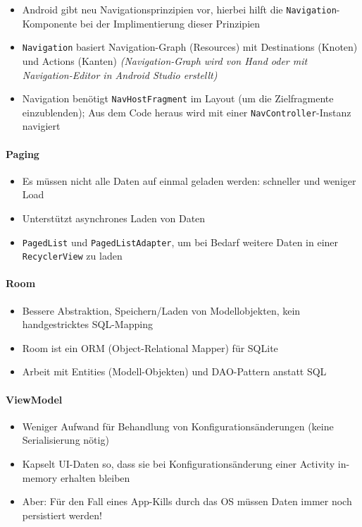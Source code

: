 \documentclass[a4paper]{article}
\begin{document}
				\begin{itemize}
					\item Android gibt neu Navigationsprinzipien vor, hierbei hilft die \texttt{Navigation}-Komponente bei der Implimentierung dieser Prinzipien
					\item \texttt{Navigation} basiert Navigation-Graph (Resources) mit Destinations (Knoten) und Actions (Kanten)
						\textit{(Navigation-Graph wird von Hand oder mit Navigation-Editor in Android Studio erstellt)}
					\item Navigation benötigt \texttt{NavHostFragment} im Layout (um die Zielfragmente einzublenden);
					Aus dem Code heraus wird mit einer \texttt{NavController}-Instanz navigiert
				\end{itemize}
			
				\paragraph{Paging}
				
				\begin{itemize}
					\item Es müssen nicht alle Daten auf einmal geladen werden: schneller und weniger Load
					\item Unterstützt asynchrones Laden von Daten
					\item \texttt{PagedList} und \texttt{PagedListAdapter}, um bei Bedarf weitere Daten in einer \texttt{RecyclerView} zu laden
				\end{itemize}
			
				\paragraph{Room}
				
				\begin{itemize}
					\item Bessere Abstraktion, Speichern/Laden von Modellobjekten, kein handgestricktes SQL-Mapping
					\item Room ist ein ORM (Object-Relational Mapper) für SQLite
					\item Arbeit mit Entities (Modell-Objekten) und DAO-Pattern anstatt SQL
				\end{itemize}
			
				\paragraph{ViewModel}
				
				\begin{itemize}
					\item Weniger Aufwand für Behandlung von Konfigurationsänderungen (keine Serialisierung nötig)
					\item Kapselt UI-Daten so, dass sie bei Konfigurationsänderung einer Activity in-memory erhalten bleiben
					\item Aber: Für den Fall eines App-Kills durch das OS müssen Daten immer noch persistiert werden!
				\end{itemize}
			
\end{document}

